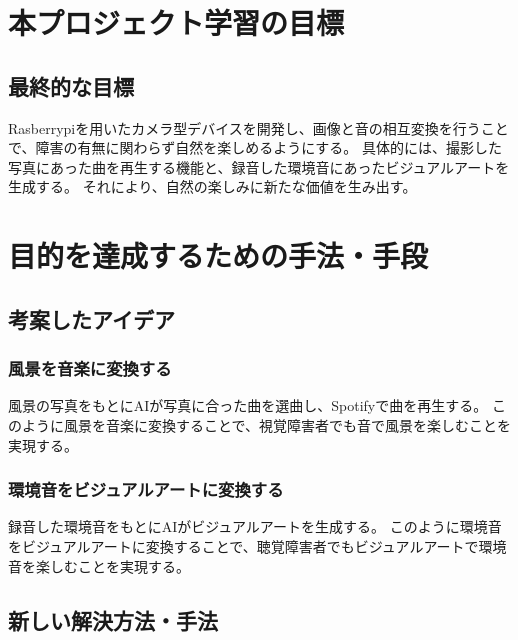 \chapter{本プロジェクト学習の目標}
\section{最終的な目標}
Rasberrypiを用いたカメラ型デバイスを開発し、画像と音の相互変換を行うことで、障害の有無に関わらず自然を楽しめるようにする。
具体的には、撮影した写真にあった曲を再生する機能と、録音した環境音にあったビジュアルアートを生成する。
それにより、自然の楽しみに新たな価値を生み出す。 

\chapter{目的を達成するための手法・手段}
\section{考案したアイデア}
\subsection{風景を音楽に変換する}
風景の写真をもとにAIが写真に合った曲を選曲し、Spotifyで曲を再生する。
このように風景を音楽に変換することで、視覚障害者でも音で風景を楽しむことを実現する。

\subsection{環境音をビジュアルアートに変換する}
録音した環境音をもとにAIがビジュアルアートを生成する。
このように環境音をビジュアルアートに変換することで、聴覚障害者でもビジュアルアートで環境音を楽しむことを実現する。

\section{新しい解決方法・手法}
